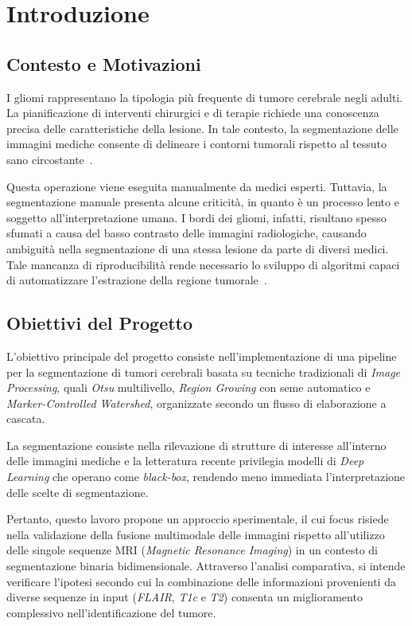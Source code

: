 \chapter{Introduzione}

\section{Contesto e Motivazioni}
I gliomi rappresentano la tipologia più frequente di tumore cerebrale negli adulti. La pianificazione di interventi chirurgici e di terapie richiede una conoscenza precisa delle caratteristiche della lesione. In tale contesto, la segmentazione delle immagini mediche consente di delineare i contorni tumorali rispetto al tessuto sano circostante~\cite{antonelli_medical_2022}.

Questa operazione viene eseguita manualmente da medici esperti. Tuttavia, la segmentazione manuale presenta alcune criticità, in quanto è un processo lento e soggetto all’interpretazione umana. I bordi dei gliomi, infatti, risultano spesso sfumati a causa del basso contrasto delle immagini radiologiche, causando ambiguità nella segmentazione di una stessa lesione da parte di diversi medici. Tale mancanza di riproducibilità rende necessario lo sviluppo di algoritmi capaci di automatizzare l'estrazione della regione tumorale~\cite{menze2015}.

\section{Obiettivi del Progetto}
L’obiettivo principale del progetto consiste nell'implementazione di una pipeline per la segmentazione di tumori cerebrali basata su tecniche tradizionali di \textit{Image Processing}, quali \textit{Otsu} multilivello, \textit{Region Growing} con seme automatico e \textit{Marker-Controlled Watershed}, organizzate secondo un flusso di elaborazione a cascata.

La segmentazione consiste nella rilevazione di strutture di interesse all'interno delle immagini mediche e la letteratura recente privilegia modelli di \textit{Deep Learning} che operano come \textit{black-box}, rendendo meno immediata l’interpretazione delle scelte di segmentazione.

Pertanto, questo lavoro propone un approccio sperimentale, il cui focus risiede nella validazione della fusione multimodale delle immagini rispetto all'utilizzo delle singole sequenze MRI (\textit{Magnetic Resonance Imaging}) in un contesto di segmentazione binaria bidimensionale.
Attraverso l'analisi comparativa, si intende verificare l’ipotesi secondo cui la combinazione delle informazioni provenienti da diverse sequenze in input (\textit{FLAIR}, \textit{T1c} e  \textit{T2}) consenta un miglioramento complessivo nell’identificazione del tumore.


